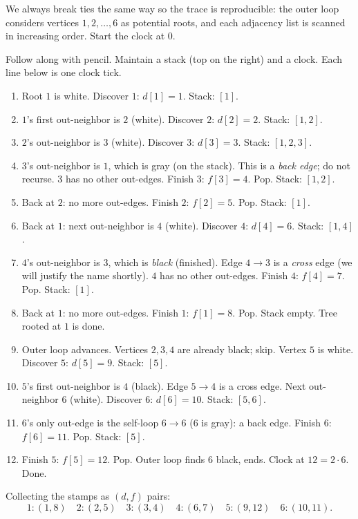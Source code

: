 We always break ties the same way so the trace is reproducible: the outer loop considers vertices $1,2,\dots,6$ as potential roots, and each adjacency list is scanned in increasing order. Start the clock at $0$.

\begin{labbox}
Follow along with pencil. Maintain a stack (top on the right) and a clock. Each line below is one clock tick.
\begin{enumerate}\itemsep0.15em
  \item Root $1$ is white. Discover $1$: $d[1]=1$. Stack: $[1]$.
  \item $1$'s first out-neighbor is $2$ (white). Discover $2$: $d[2]=2$. Stack: $[1,2]$.
  \item $2$'s out-neighbor is $3$ (white). Discover $3$: $d[3]=3$. Stack: $[1,2,3]$.
  \item $3$'s out-neighbor is $1$, which is gray (on the stack). This is a \emph{back edge}; do not recurse. $3$ has no other out-edges. Finish $3$: $f[3]=4$. Pop. Stack: $[1,2]$.
  \item Back at $2$: no more out-edges. Finish $2$: $f[2]=5$. Pop. Stack: $[1]$.
  \item Back at $1$: next out-neighbor is $4$ (white). Discover $4$: $d[4]=6$. Stack: $[1,4]$.
  \item $4$'s out-neighbor is $3$, which is \emph{black} (finished). Edge $4\to3$ is a \emph{cross} edge (we will justify the name shortly). $4$ has no other out-edges. Finish $4$: $f[4]=7$. Pop. Stack: $[1]$.
  \item Back at $1$: no more out-edges. Finish $1$: $f[1]=8$. Pop. Stack empty. Tree rooted at $1$ is done.
  \item Outer loop advances. Vertices $2,3,4$ are already black; skip. Vertex $5$ is white. Discover $5$: $d[5]=9$. Stack: $[5]$.
  \item $5$'s first out-neighbor is $4$ (black). Edge $5\to4$ is a cross edge. Next out-neighbor $6$ (white). Discover $6$: $d[6]=10$. Stack: $[5,6]$.
  \item $6$'s only out-edge is the self-loop $6\to6$ ($6$ is gray): a back edge. Finish $6$: $f[6]=11$. Pop. Stack: $[5]$.
  \item Finish $5$: $f[5]=12$. Pop. Outer loop finds $6$ black, ends. Clock at $12=2\cdot 6$. Done.
\end{enumerate}
\end{labbox}

Collecting the stamps as $(d,f)$ pairs:
\[
1{:}(1,8)\quad 2{:}(2,5)\quad 3{:}(3,4)\quad 4{:}(6,7)\quad 5{:}(9,12)\quad 6{:}(10,11).
\]

